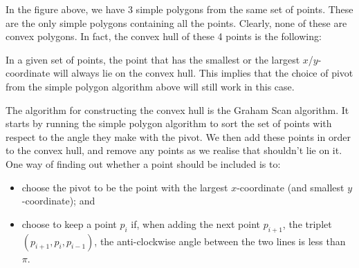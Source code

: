 \documentclass[a4paper, openany]{memoir}
\begin{document}
\noindent In the figure above, we have 3 simple polygons from the same set of points. These are the only simple polygons containing all the points. Clearly, none of these are convex polygons. In fact, the convex hull of these 4 points is the following:
\begin{figure}[H]
    \centering
\end{figure}

In a given set of points, the point that has the smallest or the largest $x$/$y$-coordinate will always lie on the convex hull. This implies that the choice of pivot from the simple polygon algorithm above will still work in this case.


The algorithm for constructing the convex hull is the Graham Scan algorithm. It starts by running the simple polygon algorithm to sort the set of points with respect to the angle they make with the pivot. We then add these points in order to the convex hull, and remove any points as we realise that shouldn't lie on it. One way of finding out whether a point should be included is to:
\begin{itemize}
    \item choose the pivot to be the point with the largest $x$-coordinate (and smallest $y$-coordinate); and
    \item choose to keep a point $p_i$ if, when adding the next point $p_{i+1}$, the triplet $(p_{i+1}, p_i, p_{i-1})$, the anti-clockwise angle between the two lines is less than $\pi$.
\end{itemize}
\end{document}
